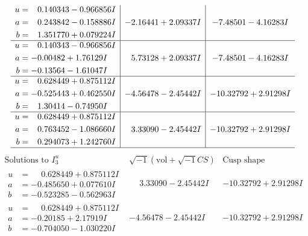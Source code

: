 \documentclass[1p]{elsarticle_modified}
\theoremstyle{definition}
\newcommand{\I}{\sqrt{-1}}
\begin{document}
$$\begin{array}{c|c|c}
\begin{aligned}
u &= \phantom{-}0.140343 - 0.966856 I \\
a &= \phantom{-}0.243842 - 0.158886 I \\
b &= \phantom{-}1.351770 + 0.079224 I\end{aligned}
 & -2.16441 + 2.09337 I & -7.48501 - 4.16283 I \\ \hline\begin{aligned}
u &= \phantom{-}0.140343 - 0.966856 I \\
a &= -0.00482 + 1.76129 I \\
b &= -0.13564 - 1.61047 I\end{aligned}
 & \phantom{-}5.73128 + 2.09337 I & -7.48501 - 4.16283 I \\ \hline\begin{aligned}
u &= \phantom{-}0.628449 + 0.875112 I \\
a &= -0.525443 + 0.462550 I \\
b &= \phantom{-}1.30414 - 0.74950 I\end{aligned}
 & -4.56478 - 2.45442 I & -10.32792 + 2.91298 I \\ \hline\begin{aligned}
u &= \phantom{-}0.628449 + 0.875112 I \\
a &= \phantom{-}0.763452 - 1.086660 I \\
b &= \phantom{-}0.294073 + 1.242760 I\end{aligned}
 & \phantom{-}3.33090 - 2.45442 I & -10.32792 + 2.91298 I\\
 \hline 
 \end{array}$$\newpage$$\begin{array}{c|c|c}  
\text{Solutions to }I^u_{3}& \I (\text{vol} + \sqrt{-1}CS) & \text{Cusp shape}\\
 \hline 
\begin{aligned}
u &= \phantom{-}0.628449 + 0.875112 I \\
a &= -0.485650 + 0.077610 I \\
b &= -0.523285 - 0.562963 I\end{aligned}
 & \phantom{-}3.33090 - 2.45442 I & -10.32792 + 2.91298 I \\ \hline\begin{aligned}
u &= \phantom{-}0.628449 + 0.875112 I \\
a &= -0.20185 + 2.17919 I \\
b &= -0.704050 - 1.030220 I\end{aligned}
 & -4.56478 - 2.45442 I & -10.32792 + 2.91298 I \\ \hline\begin{aligned}

\end{aligned}
\end{array}$$
\end{document}
